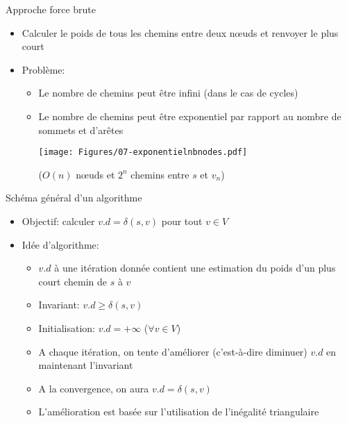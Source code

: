 \begin{frame}{Approche force brute}

\begin{itemize}
\item Calculer le poids de tous les chemins entre deux n\oe uds et renvoyer le plus court
\item Problème:
\begin{itemize}
\item Le nombre de chemins peut être infini (dans le cas de cycles)

\item Le nombre de chemins peut être exponentiel par rapport au nombre de sommets et d'arêtes\\

\bigskip

\centerline{\texttt{[image: Figures/07-exponentielnbnodes.pdf]}}

\bigskip

\centerline{($O(n)$ n\oe uds et $2^n$ chemins entre $s$ et $v_n$)}

\end{itemize}
\end{itemize}

\end{frame}

\begin{frame}{Schéma général d'un algorithme}

\begin{itemize}
\item Objectif: calculer $v.d=\delta(s,v)$ pour tout $v\in V$

\bigskip

\item Idée d'algorithme:
\begin{itemize}
\item $v.d$ à une itération donnée contient une \alert{estimation} du poids d'un plus court chemin de $s$ à $v$
\item Invariant: $v.d\geq \delta(s,v)$
\item Initialisation: $v.d=+\infty$ ($\forall v \in V$)
\item A chaque itération, on tente d'améliorer (c'est-à-dire diminuer) $v.d$ en maintenant l'invariant
\item A la convergence, on aura $v.d=\delta(s,v)$
\item L'amélioration est basée sur l'utilisation de l'inégalité triangulaire
\end{itemize}
\end{itemize}

\end{frame}

